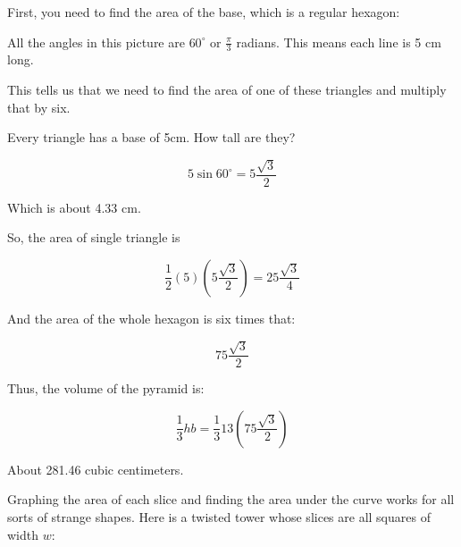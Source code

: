 \begin{Answer}[ref=pyramid_volume]
  First, you need to find the area of the base, which is a regular hexagon:
  

All the angles in this picture are $60^\circ$ or $\frac{\pi}{3}$
radians. This means each line is 5 cm long.

This tells us that we need to find the area of one of these triangles and multiply that by six.

Every triangle has a base of 5cm. How tall are they?


$$5 \sin{60^\circ} = 5\frac{\sqrt{3}}{2}$$

Which is about 4.33 cm.

So, the area of single triangle is 

$$\frac{1}{2} (5) \left( 5\frac{\sqrt{3}}{2} \right) = 25 \frac{\sqrt{3}} {4}$$

And the area of the whole hexagon is six times that:

$$75 \frac{\sqrt{3}}{2}$$

Thus, the volume of the pyramid is:

$$\frac{1}{3}h b = \frac{1}{3} 13 \left(75 \frac{\sqrt{3}}{2}\right)$$

About 281.46 cubic centimeters.

\end{Answer}

Graphing the area of each slice and finding the area under the curve
works for all sorts of strange shapes. Here is a twisted tower whose
slices are all squares of width $w$:

